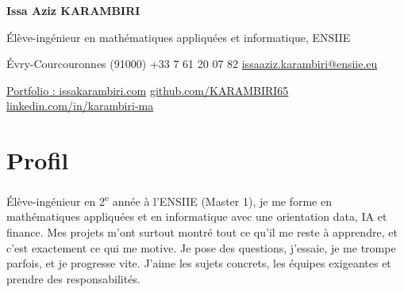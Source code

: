 \documentclass[10pt]{article}
\newif\ifstage
\begin{document}
{\fontsize{24}{26}\selectfont\bfseries Issa Aziz KARAMBIRI}\par\vspace{3pt}
Élève-ingénieur en mathématiques appliquées et informatique, ENSIIE\par
\ifstage\textbf{Recherche un stage de 3 à 4 mois à partir de mai 2027 en data science, IA, data analyse ou finance}\par\fi\vspace{2pt}
Évry-Courcouronnes (91000) \quad\textperiodcentered\quad +33 7 61 20 07 82 \quad\textperiodcentered\quad \href{mailto:issaaziz.karambiri@ensiie.eu}{issaaziz.karambiri@ensiie.eu}\par
\href{https://issakarambiri.com}{Portfolio : issakarambiri.com} \quad\textperiodcentered\quad \href{https://github.com/KARAMBIRI65}{github.com/KARAMBIRI65} \quad\textperiodcentered\quad \href{https://www.linkedin.com/in/karambiri-ma}{linkedin.com/in/karambiri-ma}\par

\section*{Profil}
\ifstage
Élève-ingénieur en 2\textsuperscript{e} année à l'ENSIIE (Master 1), je cherche un stage où l'on me confie de vrais sujets, quitte à sortir de ma zone de confort. Mes projets m'ont surtout montré tout ce qu'il me reste à apprendre, et c'est exactement ce qui me motive. Je pose des questions, j'essaie, je me trompe parfois, et je progresse vite. Je veux rejoindre une équipe exigeante, apprendre à son contact et prendre des responsabilités au fil du stage.
\else
Élève-ingénieur en 2\textsuperscript{e} année à l'ENSIIE (Master 1), je me forme en mathématiques appliquées et en informatique avec une orientation data, IA et finance. Mes projets m'ont surtout montré tout ce qu'il me reste à apprendre, et c'est exactement ce qui me motive. Je pose des questions, j'essaie, je me trompe parfois, et je progresse vite. J'aime les sujets concrets, les équipes exigeantes et prendre des responsabilités.
\fi
\end{document}
